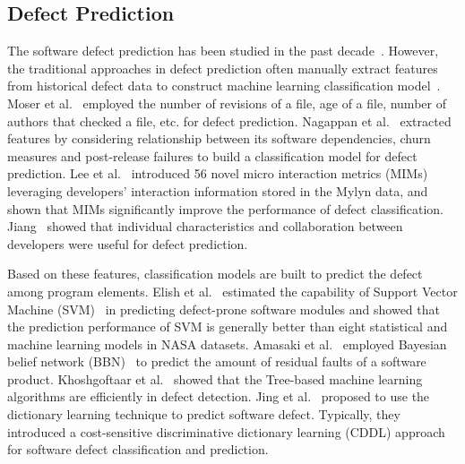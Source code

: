 \subsection{Defect Prediction}
\label{sec:defect}


The software defect prediction has been studied in the past decade~\cite{nam2013transfer, menzies2010defect, menzies2007data, zimmermann2007predicting, jiang2013personalized, nagappan2007using, nguyen2011topic, wang2012compressed}. However, the traditional approaches in defect prediction often manually extract features from historical defect data to construct machine learning classification model~\cite{menzies2010defect}. 
Moser et al.~\cite{moser2008comparative} employed the number of revisions of a file, age of a file, number of authors that checked a file, etc. for defect prediction. Nagappan et al.~\cite{nagappan2007using} extracted features by considering relationship between its software
dependencies, churn measures and post-release failures to build a classification model for defect prediction. Lee et al.~\cite{lee2011micro} introduced 56 novel micro interaction metrics (MIMs) leveraging developers' interaction information stored in the Mylyn data, and shown that MIMs significantly improve the performance of defect classification. Jiang~\cite{jiang2013personalized} showed that individual characteristics and collaboration between developers were useful for defect prediction. 

Based on these features, classification models are built to predict the defect among program elements. Elish et al.~\cite{elish2008predicting} estimated the capability of Support Vector Machine (SVM)~\cite{suykens1999least} in predicting defect-prone software modules and showed that the prediction performance of SVM is generally better than eight statistical and machine learning models in NASA datasets. Amasaki et al.~\cite{amasaki2003bayesian} employed Bayesian belief network (BBN)~\cite{mcabeebayesian} to predict the amount of residual faults of a software product. Khoshgoftaar et al.~\cite{khoshgoftaar2002tree}
showed that the Tree-based machine learning algorithms are efficiently in defect detection. Jing et al.~\cite{jing2014dictionary} proposed to use the dictionary learning technique to predict software defect. Typically, they introduced a cost-sensitive discriminative dictionary learning (CDDL) approach for software defect classification and prediction.

